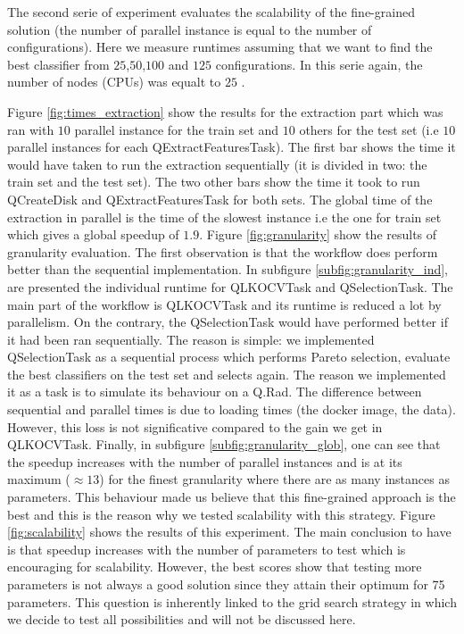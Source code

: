 \documentclass[10pt, conference, compsocconf]{IEEEtran}
\begin{document}
The second serie of experiment evaluates the scalability of the fine-grained solution (the number of parallel instance is equal to the 
number of configurations). Here we measure runtimes assuming that we want to find the best classifier from $25$,$50$,$100$ and $125$ 
configurations. In this serie again, the number of nodes (CPUs) was equalt to $25$ .  

Figure \ref{fig:times_extraction} show the results for the extraction part which was ran with $10$ parallel instance for the train set and $10$ others for the test set (i.e $10$ parallel instances for each QExtractFeaturesTask). The first bar shows the time it would have taken to run the extraction sequentially (it is divided in two: the train set and the test set). The two other bars show the time it took to run QCreateDisk and QExtractFeaturesTask for both sets. The global time of the extraction in parallel is the time of the slowest instance i.e the one for train set which gives a global speedup of $1.9$. Figure \ref{fig:granularity} show the results of granularity evaluation. The first observation is that the workflow does perform better than the sequential implementation. In subfigure \ref{subfig:granularity_ind}, are presented the individual runtime for QLKOCVTask and QSelectionTask. The main part of the workflow is QLKOCVTask and its runtime is reduced a lot by parallelism. On the contrary, the QSelectionTask would have performed better if it had been ran sequentially. The reason is simple: we implemented QSelectionTask as a sequential process which performs Pareto selection, evaluate the best classifiers on the test set and selects again. The reason we implemented it as a task is to simulate its behaviour on a Q.Rad. The difference between sequential and parallel times is due to loading times (the docker image, the data). However, this loss is not significative compared to the gain we get in QLKOCVTask.  Finally, in subfigure \ref{subfig:granularity_glob}, one can see that the speedup increases with the number of parallel instances and is at its maximum ($\approx 13$) for the finest granularity where there are as many instances as parameters. This behaviour made us believe that this fine-grained approach is the best and this is the reason why we tested scalability with this strategy. Figure \ref{fig:scalability} shows the results of this experiment. The main conclusion to have is that speedup increases with the number of parameters to test which is encouraging for scalability. However, the best scores show that testing more parameters is not always a good solution since they attain their optimum for 75 parameters. This question is inherently linked to the grid search strategy in which we decide to test all possibilities and will not be discussed here.
\end{document}
